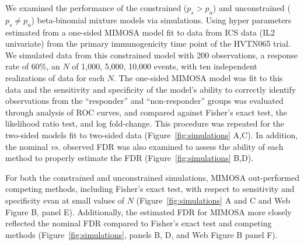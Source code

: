 \documentclass[useAMS,referee,usenatbib]{biom}
\begin{document}
We examined the performance of the constrained ($p_s>p_u$) and unconstrained ($p_s \ne p_u$) beta-binomial mixture models via simulations. Using hyper parameters estimated from a one-sided MIMOSA model fit to data from ICS data (IL2 univariate) from the primary immunogenicity time point of the HVTN065 trial. We simulated data from this constrained model with 200 observations, a response rate of 60\%, an $N$ of 1,000, 5,000, 10,000 events, with ten independent realizations of data for each $N$. The one-sided MIMOSA model was fit to this data and the sensitivity and specificity of the model's ability to correctly identify observations from the ``responder'' and ``non-responder'' groups was evaluated through analysis of ROC curves, and compared against Fisher's exact test, the likelihood ratio test, and log fold-change. This procedure was repeated for the two-sided models fit to two-sided data (Figure~\ref{fig:simulations} A,C). In addition, the nominal \textit{vs.} observed FDR was also examined to assess the ability of each method to properly estimate the FDR (Figure~\ref{fig:simulations} B,D). 

For both the constrained and unconstrained simulations, MIMOSA out-performed competing methods, including Fisher's exact test, with respect to sensitivity and specificity evan at small values of $N$ (Figure~\ref{fig:simulations} A and C and Web Figure B, panel E). Additionally, the estimated FDR for MIMOSA more closely reflected the nominal FDR compared to Fisher's exact test and competing methods (Figure~\ref{fig:simulations}, panels B, D, and Web Figure B panel F). 
\end{document}
